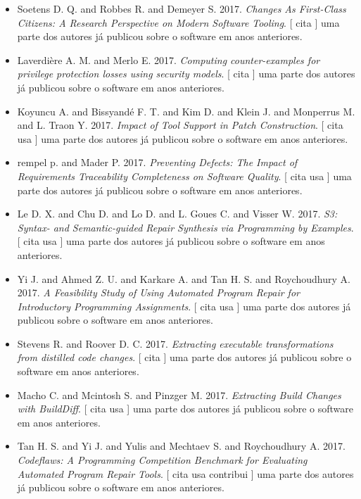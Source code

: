 \begin{itemize}
\item Soetens D. Q. and Robbes R. and Demeyer S.
      2017.
        \textit{ Changes As First-Class Citizens: A Research Perspective on Modern Software Tooling}.
      [
          cita
      ]
uma parte dos autores já publicou sobre o software em anos anteriores.
\item Laverdière A. M. and Merlo E.
      2017.
        \textit{ Computing counter-examples for privilege protection losses using security models}.
      [
          cita
      ]
uma parte dos autores já publicou sobre o software em anos anteriores.
\item Koyuncu A. and Bissyand{\'e} F. T. and Kim D. and Klein J. and Monperrus M. and L. Traon Y.
      2017.
        \textit{ Impact of Tool Support in Patch Construction}.
      [
          cita
          usa
      ]
uma parte dos autores já publicou sobre o software em anos anteriores.
\item rempel p. and Mader P.
      2017.
        \textit{ Preventing Defects: The Impact of Requirements Traceability Completeness on Software Quality}.
      [
          cita
          usa
      ]
uma parte dos autores já publicou sobre o software em anos anteriores.
\item Le D. X. and Chu D. and Lo D. and L. Goues C. and Visser W.
      2017.
        \textit{ S3: Syntax- and Semantic-guided Repair Synthesis via Programming by Examples}.
      [
          cita
          usa
      ]
uma parte dos autores já publicou sobre o software em anos anteriores.
\item Yi J. and Ahmed Z. U. and Karkare A. and Tan H. S. and Roychoudhury A.
      2017.
        \textit{ A Feasibility Study of Using Automated Program Repair for Introductory Programming Assignments}.
      [
          cita
          usa
      ]
uma parte dos autores já publicou sobre o software em anos anteriores.
\item Stevens R. and Roover D. C.
      2017.
        \textit{ Extracting executable transformations from distilled code changes}.
      [
          cita
      ]
uma parte dos autores já publicou sobre o software em anos anteriores.
\item Macho C. and Mcintosh S. and Pinzger M.
      2017.
        \textit{ Extracting Build Changes with BuildDiff}.
      [
          cita
          usa
      ]
uma parte dos autores já publicou sobre o software em anos anteriores.
\item Tan H. S. and Yi J. and Yulis and Mechtaev S. and Roychoudhury A.
      2017.
        \textit{ Codeflaws: A Programming Competition Benchmark for Evaluating Automated Program Repair Tools}.
      [
          cita
          usa
          contribui
      ]
uma parte dos autores já publicou sobre o software em anos anteriores.
\end{itemize}
